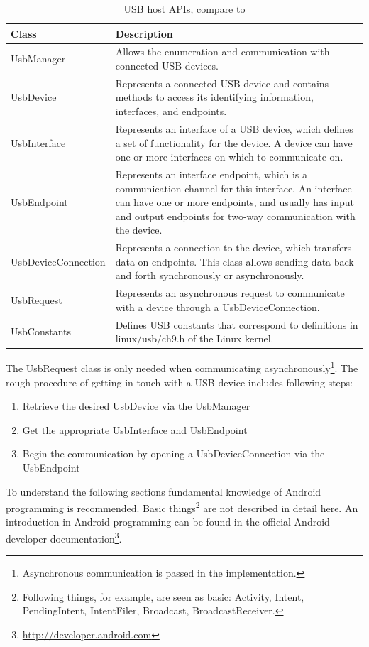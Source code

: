 \begin{table}[ht]
\caption{USB host APIs, compare to \cite{android_usb_host}}
\centering
\begin{tabular}{|l|p{10cm}|}
\hline\hline
\textbf{Class} & \textbf{Description} \\ \hline
UsbManager & Allows the enumeration and communication with connected USB devices. \\ \hline
UsbDevice & Represents a connected USB device and contains methods to access its identifying information, interfaces, and endpoints. \\ \hline
UsbInterface & Represents an interface of a USB device, which defines a set of functionality for the device. A device can have one or more interfaces on which to communicate on. \\ \hline
UsbEndpoint & Represents an interface endpoint, which is a communication channel for this interface. An interface can have one or more endpoints, and usually has input and output endpoints for two-way communication with the device. \\ \hline
UsbDeviceConnection & Represents a connection to the device, which transfers data on endpoints. This class allows sending data back and forth synchronously or asynchronously. \\ \hline
UsbRequest & Represents an asynchronous request to communicate with a device through a UsbDeviceConnection. \\ \hline
UsbConstants & Defines USB constants that correspond to definitions in linux/usb/ch9.h of the Linux kernel. \\ \hline
\end{tabular}
\label{table:host_api}
\end{table}

The UsbRequest class is only needed when communicating asynchronously\footnote{Asynchronous communication is passed in the implementation.}. The rough procedure of getting in touch with a USB device includes following steps:

\begin{enumerate}
\item Retrieve the desired UsbDevice via the UsbManager
\item Get the appropriate UsbInterface and UsbEndpoint
\item Begin the communication by opening a UsbDeviceConnection via the UsbEndpoint
\end{enumerate}

To understand the following sections fundamental knowledge of Android programming is recommended. Basic things\footnote{Following things, for example, are seen as basic: Activity, Intent, PendingIntent, IntentFiler, Broadcast, BroadcastReceiver.} are not described in detail here. An introduction in Android programming can be found in the official Android developer documentation\footnote{\url{http://developer.android.com}}.

